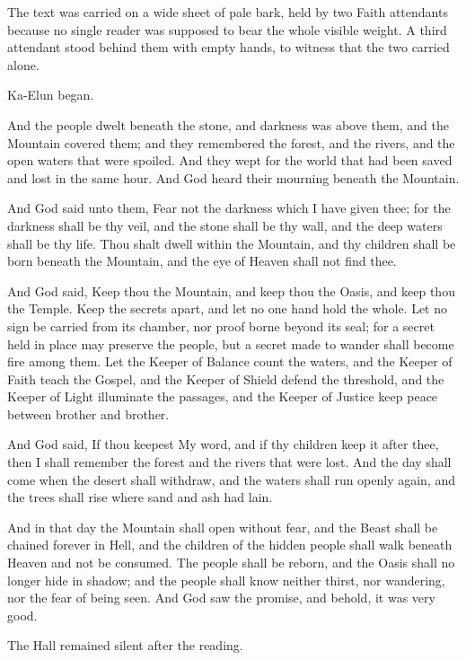 The text was carried on a wide sheet of pale bark, held by two Faith attendants because no single reader was supposed to bear the whole visible weight.
A third attendant stood behind them with empty hands, to witness that the two carried alone.\par
Ka-Elun began.\par
\begin{scripture}
And the people dwelt beneath the stone, and darkness was above them, and the Mountain covered them; and they remembered the forest, and the rivers, and the open waters that were spoiled.
And they wept for the world that had been saved and lost in the same hour.
And God heard their mourning beneath the Mountain.

And God said unto them, Fear not the darkness which I have given thee; for the darkness shall be thy veil, and the stone shall be thy wall, and the deep waters shall be thy life.
Thou shalt dwell within the Mountain, and thy children shall be born beneath the Mountain, and the eye of Heaven shall not find thee.

And God said, Keep thou the Mountain, and keep thou the Oasis, and keep thou the Temple.
Keep the secrets apart, and let no one hand hold the whole.
Let no sign be carried from its chamber, nor proof borne beyond its seal; for a secret held in place may preserve the people, but a secret made to wander shall become fire among them.
Let the Keeper of Balance count the waters, and the Keeper of Faith teach the Gospel, and the Keeper of Shield defend the threshold, and the Keeper of Light illuminate the passages, and the Keeper of Justice keep peace between brother and brother.

And God said, If thou keepest My word, and if thy children keep it after thee, then I shall remember the forest and the rivers that were lost.
And the day shall come when the desert shall withdraw, and the waters shall run openly again, and the trees shall rise where sand and ash had lain.

And in that day the Mountain shall open without fear, and the Beast shall be chained forever in Hell, and the children of the hidden people shall walk beneath Heaven and not be consumed.
The people shall be reborn, and the Oasis shall no longer hide in shadow; and the people shall know neither thirst, nor wandering, nor the fear of being seen.
And God saw the promise, and behold, it was very good.
\end{scripture}
The Hall remained silent after the reading.\par
